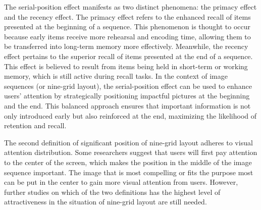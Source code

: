 The serial-position effect manifests as two distinct phenomena: the primacy effect and the recency effect. The primacy effect refers to the enhanced recall of items presented at the beginning of a sequence. This phenomenon is thought to occur because early items receive more rehearsal and encoding time, allowing them to be transferred into long-term memory more effectively. Meanwhile, the recency effect pertains to the superior recall of items presented at the end of a sequence. This effect is believed to result from items being held in short-term or working memory, which is still active during recall tasks\cite{glanzer1966two}. In the context of image sequences (or nine-grid layout), the serial-position effect can be used to enhance users’ attention by strategically positioning impactful pictures at the beginning and the end. This balanced approach ensures that important information is not only introduced early but also reinforced at the end, maximizing the likelihood of retention and recall. 

The second definition of significant position of nine-grid layout adheres to visual attention distribution\cite{ma2023suggest}. Some researchers suggest that users will first pay attention to the center of the screen, which makes the position in the middle of the image sequence important. The image that is most compelling or fits the purpose most can be put in the center to gain more visual attention from users. However, further studies on which of the two definitions has the highest level of attractiveness in the situation of nine-grid layout are still needed.
